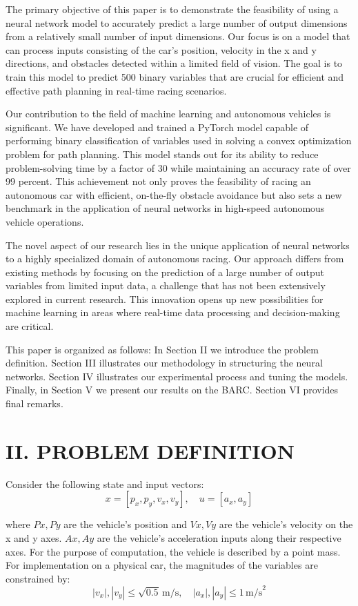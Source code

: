 \documentclass[
	letterpaper, %
	10pt, %
	unnumberedsections, %
	twoside, %
]{LTJournalArticle}
\begin{document}
The primary objective of this paper is to demonstrate the feasibility of using a neural network model to accurately predict a large number of output dimensions from a relatively small number of input dimensions. Our focus is on a model that can process inputs consisting of the car’s position, velocity in the x and y directions, and obstacles detected within a limited field of vision. The goal is to train this model to predict 500 binary variables that are crucial for efficient and effective path planning in real-time racing scenarios.

Our contribution to the field of machine learning and autonomous vehicles is significant. We have developed and trained a PyTorch model capable of performing binary classification of variables used in solving a convex optimization problem for path planning. This model stands out for its ability to reduce problem-solving time by a factor of 30 while maintaining an accuracy rate of over 99 percent. This achievement not only proves the feasibility of racing an autonomous car with efficient, on-the-fly obstacle avoidance but also sets a new benchmark in the application of neural networks in high-speed autonomous vehicle operations.

The novel aspect of our research lies in the unique application of neural networks to a highly specialized domain of autonomous racing. Our approach differs from existing methods by focusing on the prediction of a large number of output variables from limited input data, a challenge that has not been extensively explored in current research. This innovation opens up new possibilities for machine learning in areas where real-time data processing and decision-making are critical.

This paper is organized as follows: In Section II we introduce the problem definition. Section III illustrates our methodology in structuring the neural networks. Section IV illustrates our experimental process and tuning the models. Finally, in Section V we present our results on the BARC. Section VI provides final remarks.

\section{II. PROBLEM DEFINITION}

Consider the following state and input vectors:
\[x = [p_x, p_y, v_x, v_y], \quad u = [a_x, a_y]\]

\noindent where \(Px, Py\) are the vehicle’s position and \(Vx, Vy\) are the vehicle’s velocity on the x and y axes. \(Ax, Ay\) are the vehicle’s acceleration inputs along their respective axes. For the purpose of computation, the vehicle is described by a point mass. For implementation on a physical car, the magnitudes of the variables are constrained by:
\[\left| v_x \right|, \left| v_y \right| \leq \sqrt{0.5} \, \text{m/s}, \quad \left| a_x \right|, \left| a_y \right| \leq 1 \, \text{m/s}^2\]
\end{document}
